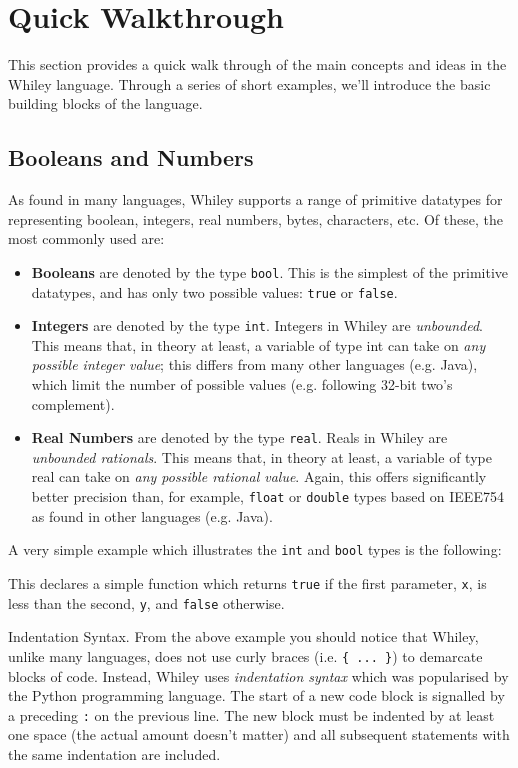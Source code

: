 \newpage
\section{Quick Walkthrough}
This section provides a quick walk through of the main concepts and
ideas in the Whiley language.  Through a series of short examples,
we'll introduce the basic building blocks of the language.

\subsection{Booleans and Numbers}

As found in many languages, Whiley supports a range of primitive
datatypes for representing boolean, integers, real numbers, bytes,
characters, etc.  Of these, the most commonly used are:

\begin{itemize}
\item {\bf Booleans} are denoted by the type \lstinline{bool}.  This is the
  simplest of the primitive datatypes, and has only two possible
  values: \lstinline{true} or \lstinline{false}.
\item {\bf Integers} are denoted by the type \lstinline{int}.  Integers in
  Whiley are {\em unbounded}. This means that, in theory at least, a
  variable of type int can take on {\em any possible integer value};
  this differs from many other languages (e.g. Java), which limit the
  number of possible values (e.g. following 32-bit two's complement).
\item {\bf Real Numbers} are denoted by the type
  \lstinline{real}. Reals in Whiley are {\em unbounded
    rationals}. This means that, in theory at least, a variable of
  type real can take on {\em any possible rational value}. Again, this
  offers significantly better precision than, for example,
  \lstinline{float} or \lstinline{double} types based on IEEE754 as
  found in other languages (e.g. Java).
\end{itemize}


\noindent A very simple example which illustrates the \lstinline{int} and
\lstinline{bool} types is the following:



This declares a simple function which returns \lstinline{true} if the
first parameter, \lstinline{x}, is less than the second,
\lstinline{y}, and \lstinline{false} otherwise.

\begin{insight}{Indentation Syntax.}
  From the above example you should notice that Whiley, unlike many
  languages, does not use curly braces (i.e. \verb+{ ... }+) to
  demarcate blocks of code.  Instead, Whiley uses {\em indentation
    syntax} which was popularised by the Python programming language.
  The start of a new code block is signalled by a preceding \verb+:+
  on the previous line.  The new block must be indented by at least
  one space (the actual amount doesn't matter) and all subsequent
  statements with the same indentation are included.
\end{insight}

